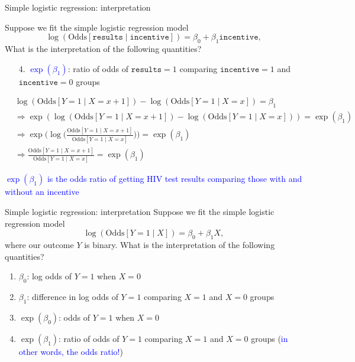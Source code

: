 \documentclass[10pt,t]{beamer}
\begin{document}
\begin{frame}{Simple logistic regression: interpretation}
	
	\vspace{-5 mm}
	
	Suppose we fit the simple logistic regression model $$\log\left(\text{Odds}[\texttt{results} \mid \texttt{incentive}]\right) = \beta_0 + \beta_1 \texttt{incentive},$$ What is the interpretation of the following quantities?
	\medskip
	\begin{enumerate}
		\item[4.] \textcolor{blue}{$\exp(\beta_1)$}: ratio of odds of $\texttt{results} = 1$ comparing $\texttt{incentive} = 1$ and $\texttt{incentive} = 0$ groups
	\end{enumerate} 
\begin{footnotesize}
	\begin{align*}
		&\log\left(\text{Odds}[Y =1 \mid X = x + 1]\right) - \log\left(\text{Odds}[Y =1 \mid X = x ]\right) = \beta_1\\
		&\Rightarrow \exp(\log\left(\text{Odds}[Y =1 \mid X = x + 1]\right) - \log\left(\text{Odds}[Y =1 \mid X = x ]\right)) = \exp(\beta_1)\\
		&\Rightarrow \exp\biggr(\log\biggr(\frac{\text{Odds}[Y =1 \mid X = x + 1]}{\text{Odds}[Y =1 \mid X = x ]}\biggr)\biggr) = \exp(\beta_1)\\
		&\Rightarrow \frac{\text{Odds}[Y =1 \mid X = x + 1]}{\text{Odds}[Y =1 \mid X = x ]} = \exp(\beta_1)
	\end{align*}
	\medskip
	\normalsize
	
	\textcolor{blue}{$\exp(\beta_1)$ is the odds ratio of getting HIV test results comparing those with and without an incentive}
	
\end{footnotesize}
\end{frame}

\begin{frame}{Simple logistic regression: interpretation}
	Suppose we fit the simple logistic regression model $$\log\left(\text{Odds}[Y =1 \mid X]\right) = \beta_0 + \beta_1 X,$$ where our outcome $Y$ is binary. What is the interpretation of the following quantities?
	\medskip
	
	\begin{enumerate}
		\item $\beta_0$: log odds of $Y = 1$ when $X = 0$  
		\item $\beta_1$: difference in log odds of $Y = 1$ comparing $X = 1$ and $X =0$ groups  
		\item $\exp(\beta_0)$: odds of $Y = 1$ when $X = 0$  
		\item $\exp(\beta_1)$: ratio of odds of $Y = 1$ comparing $X = 1$ and $X = 0$ groups (\textcolor{blue}{in other words, the odds ratio!})
	\end{enumerate} 
\end{frame}
\end{document}
